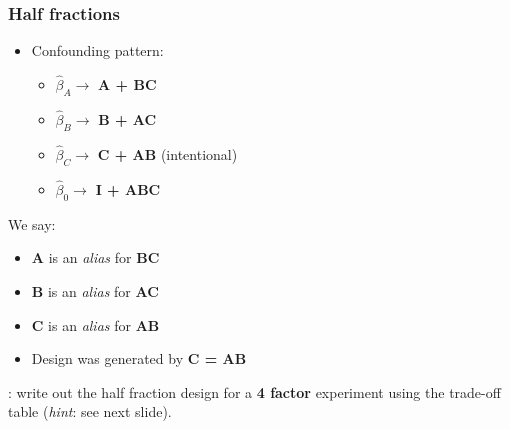 \begin{frame}\frametitle{Half fractions}
	\begin{itemize}
		\item	Confounding pattern:
		\begin{itemize}
			\item	$\widehat{\beta}_A \rightarrow$ \textbf{A + BC}
			\item	$\widehat{\beta}_B \rightarrow$ \textbf{B + AC}
			\item	$\widehat{\beta}_C \rightarrow$ \textbf{C + AB} (intentional)
			\item	$\widehat{\beta}_0 \rightarrow$ \textbf{I + ABC}
		\end{itemize}
	\end{itemize}

	We say:
	\begin{itemize}
		\item	\textbf{A} is an \emph{alias} for \textbf{BC}
		\item	\textbf{B} is an \emph{alias} for \textbf{AC}
		\item	\textbf{C} is an \emph{alias} for \textbf{AB}
		\item	Design was generated by \textbf{C = AB}
	\end{itemize}
	
	\vspace{12pt}
	{\color{myOrange}{Homework}}: write out the half fraction design for a {\color{myOrange}\textbf{4 factor}} experiment using the trade-off table (\emph{hint}: see next slide).
\end{frame}

